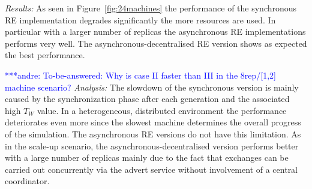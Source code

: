 \documentclass{rspublic}
\newcommand{\alnote}[1]{ {\textcolor{blue} { ***andre: #1 }}}
\newcommand{\alnote}[1]{}
\begin{document}
{{\it Results:} As seen in Figure~\ref{fig:24machines} the performance of the 
synchronous RE implementation degrades significantly the more resources are used.
In particular with a larger number of replicas the asynchronous RE implementations
performs very well. The asynchronous-decentralised RE version shows as expected
the best performance.

\alnote{To-be-answered: Why is case II faster than III 
in the 8rep/[1,2] machine scenario?}
{\it Analysis: } The slowdown of the synchronous version is mainly
caused by the synchronization phase after each generation and the associated 
high $T_{W}$ value. In a heterogeneous, distributed environment the performance
deteriorates even more since the slowest machine determines the overall progress of
the simulation. The asynchronous RE versions do not have this limitation. As in
the scale-up scenario, the asynchronous-decentralised version performs
better with a large number of replicas mainly due to the fact that exchanges
can be carried out concurrently via the advert service without 
involvement of a central coordinator.






}
\end{document}

